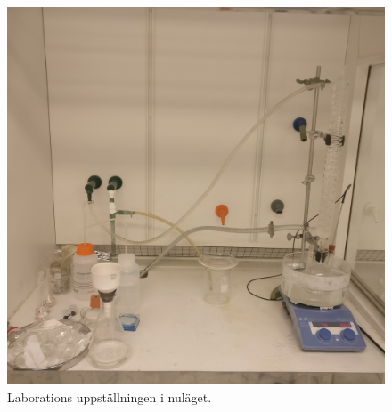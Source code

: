 \documentclass{article}
\begin{document}
\newpage
\thispagestyle{empty}
\begin{figure}[H]
    \centering
    \includegraphics[scale=0.1]{labsetup.jpg}
    \caption{Laborations uppställningen i nuläget.}
    \label{fig:lab}
\end{figure}
\end{document}
